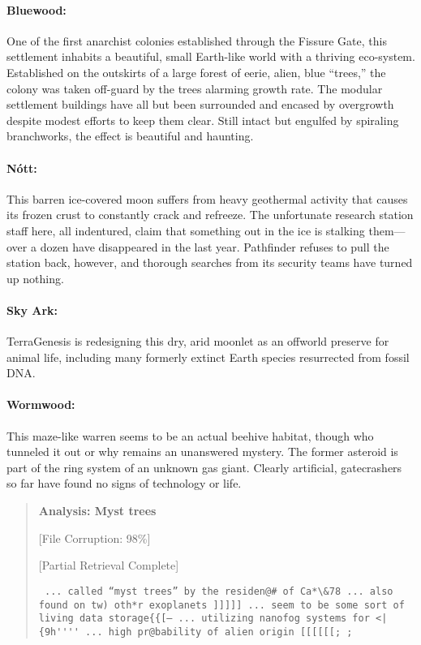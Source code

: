\paragraph{Bluewood:} \label{sec:bluewood} One of the first anarchist colonies established through the Fissure Gate, this settlement inhabits a beautiful, small Earth-like world with a thriving eco-system. Established on the outskirts of a large forest of eerie, alien, blue “trees,” the colony was taken off-guard by the trees alarming growth rate. The modular settlement buildings have all but been surrounded and encased by overgrowth despite modest efforts to keep them clear. Still intact but engulfed by spiraling branchworks, the effect is beautiful and haunting. 

\paragraph{Nótt:} \label{sec:nott} This barren ice-covered moon suffers from heavy geothermal activity that causes its frozen crust to constantly crack and refreeze. The unfortunate research station staff here, all indentured, claim that something out in the ice is stalking them—over a dozen have disappeared in the last year. Pathfinder refuses to pull the station back, however, and thorough searches from its security teams have turned up nothing. 

\paragraph{Sky Ark:} \label{sec:sky-ark} TerraGenesis is redesigning this dry, arid moonlet as an offworld preserve for animal life, including many formerly extinct Earth species resurrected from fossil DNA. 

\paragraph{Wormwood:} \label{sec:wormwood} This maze-like warren seems to be an actual beehive habitat, though who tunneled it out or why remains an unanswered mystery. The former asteroid is part of the ring system of an unknown gas giant. Clearly artificial, gatecrashers so far have found no signs of technology or life. 

\begin{quotation} \textbf{Analysis: Myst trees} 

[File Corruption: 98\%] 

[Partial Retrieval Complete] 

\begin{verbatim} ... called “myst trees” by the residen@# of Ca*\&78 ... also found on tw) oth*r exoplanets ]]]]] ... seem to be some sort of living data storage{{[— ... utilizing nanofog systems for <|{9h'''' ... high pr@bability of alien origin [[[[[[; ; \end{verbatim} \end{quotation} 



